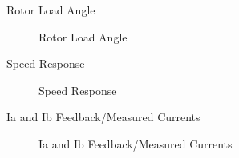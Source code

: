 \begin{frame}{Rotor Load Angle}
	\begin{figure}
		\centering
		\caption{Rotor Load Angle}
	\end{figure}
\end{frame}





\begin{frame}{Speed Response}
	\begin{figure}
		\centering

		\caption{Speed Response}
	\end{figure}
\end{frame}


\begin{frame}{Ia and Ib Feedback/Measured Currents}
	\begin{figure}
		\centering

		\caption{Ia and Ib Feedback/Measured Currents}
	\end{figure}
\end{frame}


